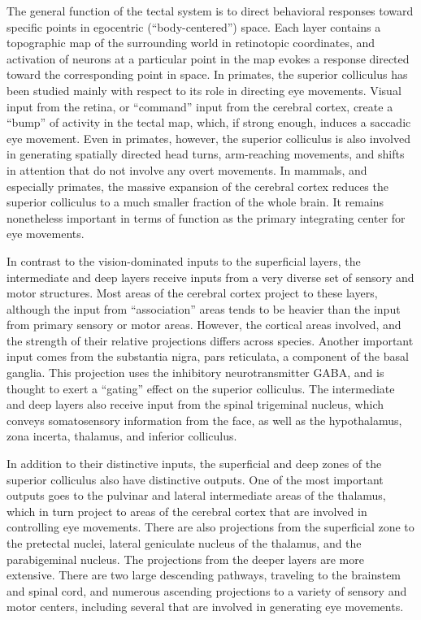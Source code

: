 The general function of the tectal system is to direct behavioral responses toward specific points in egocentric (``body-centered'') space. Each layer contains a topographic map of the surrounding world in retinotopic coordinates, and activation of neurons at a particular point in the map evokes a response directed toward the corresponding point in space. In primates, the superior colliculus has been studied mainly with respect to its role in directing eye movements. Visual input from the retina, or ``command'' input from the cerebral cortex, create a ``bump'' of activity in the tectal map, which, if strong enough, induces a saccadic eye movement. Even in primates, however, the superior colliculus is also involved in generating spatially directed head turns, arm-reaching movements, and shifts in attention that do not involve any overt movements. In mammals, and especially primates, the massive expansion of the cerebral cortex reduces the superior colliculus to a much smaller fraction of the whole brain. It remains nonetheless important in terms of function as the primary integrating center for eye movements.

In contrast to the vision-dominated inputs to the superficial layers, the intermediate and deep layers receive inputs from a very diverse set of sensory and motor structures. Most areas of the cerebral cortex project to these layers, although the input from ``association'' areas tends to be heavier than the input from primary sensory or motor areas. However, the cortical areas involved, and the strength of their relative projections differs across species. Another important input comes from the substantia nigra, pars reticulata, a component of the basal ganglia. This projection uses the inhibitory neurotransmitter GABA, and is thought to exert a ``gating'' effect on the superior colliculus. The intermediate and deep layers also receive input from the spinal trigeminal nucleus, which conveys somatosensory information from the face, as well as the hypothalamus, zona incerta, thalamus, and inferior colliculus.

In addition to their distinctive inputs, the superficial and deep zones of the superior colliculus also have distinctive outputs. One of the most important outputs goes to the pulvinar and lateral intermediate areas of the thalamus, which in turn project to areas of the cerebral cortex that are involved in controlling eye movements. There are also projections from the superficial zone to the pretectal nuclei, lateral geniculate nucleus of the thalamus, and the parabigeminal nucleus. The projections from the deeper layers are more extensive. There are two large descending pathways, traveling to the brainstem and spinal cord, and numerous ascending projections to a variety of sensory and motor centers, including several that are involved in generating eye movements.

